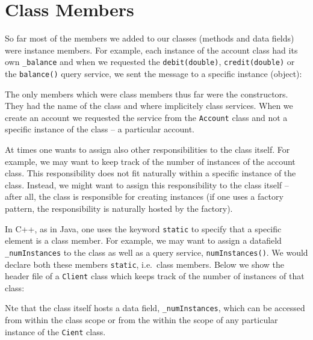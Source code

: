 \section{Class Members}

So far most of the members we added to our classes (methods and data fields)
were instance members. For example, each instance of the account class had
its own \verb+_balance+ and when we requested the \verb+debit(double)+, 
\verb+credit(double)+ or the \verb+balance()+ query service, we sent the
message to a specific instance (object):


The only members which were class members thus far were the constructors.
They had the name of the class and where implicitely class services. When
we create an account we requested the service from the \verb+Account+ class 
and not a specific instance of the class -- a particular account. 

At times one wants to assign also other responsibilities to the class itself. For
example, we may want to keep track of the number of instances of the account
class. This responsibility does not fit naturally within a specific instance
of the class. Instead, we might want to assign this responsibility to the
class itself -- after all, the class is responsible for creating instances
(if one uses a factory pattern, the responsibility is naturally hosted by
the factory).

In C++, as in Java, one uses the keyword \verb+static+ to specify that a
specific element is a class member. For example, we may want to assign a
datafield \verb+_numInstances+ to the class as well as a query service,
\verb+numInstances()+. We would declare both these members \verb+static+,
i.e.\ class members. Below we show the header file of a \verb+Client+
class which keeps track of the number of instances of that class:

\noindent{\small }

Nte that the class itself hosts a data field, \verb+_numInstances+, which can 
be accessed from within the class scope or from the within the scope of any
particular instance of the \verb+Cient+ class.


